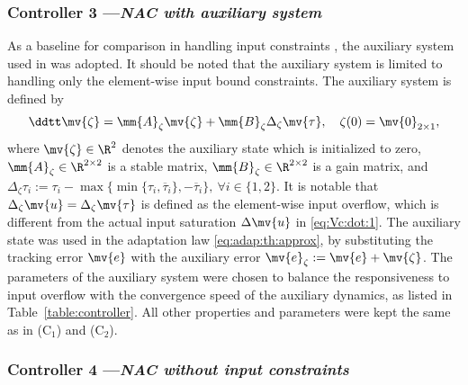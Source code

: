 \documentclass[letterpaper, journal]{IEEEtran}
\providecommand{\DIFadd}[1]{{\protect\color{blue}\uwave{#1}}} %
\providecommand{\DIFdel}[1]{{\protect\color{red}\sout{#1}}} %
\providecommand{\DIFaddbegin}{} %
\providecommand{\DIFaddend}{} %
\providecommand{\DIFdelbegin}{} %
\providecommand{\DIFdelend}{} %
\begin{document}
\subsubsection*{Controller 3 —\textit{NAC with auxiliary system}}

As a baseline for comparison in handling input constraints \DIFaddbegin \DIFadd{in NAC}\DIFaddend , the auxiliary system used in \cite{Rezaei:2025aa,Liu:2025aa,Yu:2022aa} was adopted.
It should be noted that the auxiliary system is limited to handling only the element-wise input bound constraints.
The auxiliary system is defined by 
\begin{equation}
  \ddtt \mv{\zeta} 
  =
  \mm{A}_{\zeta}
  \mv{\zeta}
  +
  \mm{B}_{\zeta}
  \Delta_{\zeta} \mv{\tau}
  ,
  \quad
  \zeta(0) 
  = 
  \mv{0}_{2\times 1}
  ,
\end{equation}
where $\mv{\zeta}\in\R^2$ denotes the auxiliary state which is initialized to zero, $\mm{A}_{\zeta}\in\R^{2\times 2}$ is a stable matrix, $\mm{B}_{\zeta}\in\R^{2\times 2}$ is a gain matrix, and $\Delta_{\zeta} \tau_i := \tau_i - \max\{\min\{\tau_i, \overline{\tau}_i\}, -\overline{\tau}_i\},\ \forall i\in\{1,2\}$.
It is notable that \DIFdelbegin \DIFdel{$\Delta_{\zeta}\mv{u}=\Delta_{\zeta}\mv{\tau}$ }\DIFdelend \DIFaddbegin \DIFadd{$\Delta_{\zeta}\mv{\tau}$ }\DIFaddend is defined as the element-wise input overflow, which is different from the actual input saturation $\Delta\mv{u}$ in \eqref{eq:Vc:dot:1}.
The auxiliary state was used in the adaptation law \eqref{eq:adap:th:approx}, by substituting the tracking error $\mv{e}$ with the auxiliary error $\mv{e}_\zeta := \mv{e} + \mv{\zeta}$.
The parameters of the auxiliary system were chosen to balance the responsiveness to input overflow with the convergence speed of the auxiliary dynamics, as listed in Table~\ref{table:controller}.
All other properties and parameters were kept the same as in (C$_1$) and (C$_2$).

\subsubsection*{Controller 4 —\textit{NAC without input constraints}}
\end{document}
